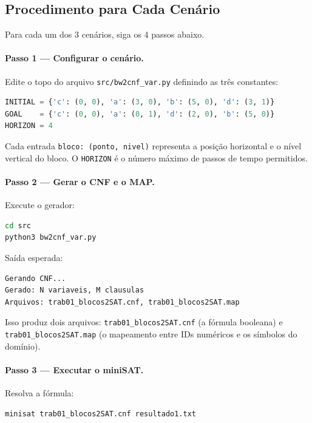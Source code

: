 \documentclass[12pt,a4paper]{article}
\begin{document}
\subsection{Procedimento para Cada Cenário}

Para cada um dos 3 cenários, siga os 4 passos abaixo.

\paragraph{Passo 1 — Configurar o cenário.}
Edite o topo do arquivo \texttt{src/bw2cnf\_var.py} definindo as três constantes:

\begin{lstlisting}[language=Python]
INITIAL = {'c': (0, 0), 'a': (3, 0), 'b': (5, 0), 'd': (3, 1)}
GOAL    = {'c': (0, 0), 'a': (0, 1), 'd': (2, 0), 'b': (5, 0)}
HORIZON = 4
\end{lstlisting}

Cada entrada \texttt{bloco: (ponto, nivel)} representa a posição horizontal e o nível vertical do bloco. O \texttt{HORIZON} é o número máximo de passos de tempo permitidos.

\paragraph{Passo 2 — Gerar o CNF e o MAP.}
Execute o gerador:

\begin{lstlisting}[language=bash]
cd src
python3 bw2cnf_var.py
\end{lstlisting}

Saída esperada:

\begin{lstlisting}
Gerando CNF...
Gerado: N variaveis, M clausulas
Arquivos: trab01_blocos2SAT.cnf, trab01_blocos2SAT.map
\end{lstlisting}

Isso produz dois arquivos: \texttt{trab01\_blocos2SAT.cnf} (a fórmula booleana) e \texttt{trab01\_blocos2SAT.map} (o mapeamento entre IDs numéricos e os símbolos do domínio).

\paragraph{Passo 3 — Executar o miniSAT.}
Resolva a fórmula:

\begin{lstlisting}[language=bash]
minisat trab01_blocos2SAT.cnf resultado1.txt
\end{lstlisting}
\end{document}
